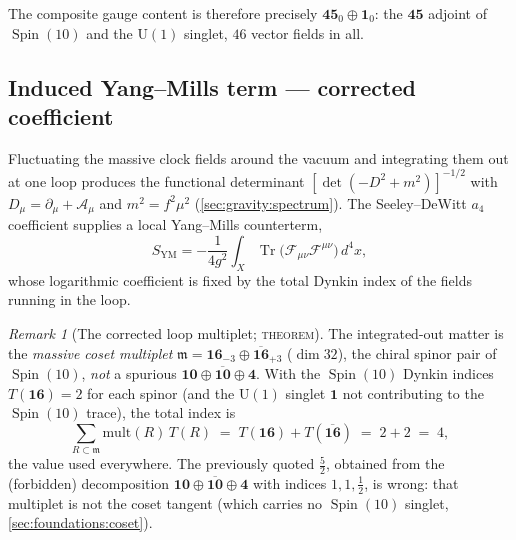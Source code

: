 \documentclass[11pt]{article}
\theoremstyle{plain}
\theoremstyle{definition}
\theoremstyle{remark}
\newtheorem{remark}[theorem]{Remark}
\newcommand{\U}[1]{\mathrm{U}(#1)}
\newcommand{\Spin}{\operatorname{Spin}}
\newcommand{\Tr}{\operatorname{Tr}}
\newcommand{\Uone}{\U{1}}
\begin{document}
The composite gauge content is therefore precisely $\mathbf{45}_{0}\oplus\mathbf 1_{0}$:
the $\mathbf{45}$ adjoint of $\Spin(10)$ and the $\Uone$ singlet,
$46$ vector fields in all.

\subsection{Induced Yang--Mills term --- corrected coefficient}
\label{sec:gauge:YM}

Fluctuating the massive clock fields around the vacuum and integrating
them out at one loop produces the functional determinant
$[\det(-D^{2}+m^{2})]^{-1/2}$ with $D_\mu=\partial_\mu+\mathcal A_\mu$ and
$m^{2}=f^{2}\mu^{2}$ (\autoref{sec:gravity:spectrum}). The Seeley--DeWitt
$a_4$ coefficient supplies a local Yang--Mills counterterm,
\begin{equation}\label{eq:gauge:YM}
  S_{\text{YM}}
  = -\frac{1}{4g^{2}}\int_{X}\Tr\!\bigl(\mathcal F_{\mu\nu}\mathcal F^{\mu\nu}\bigr)\,d^{4}x,
\end{equation}
whose logarithmic coefficient is fixed by the total Dynkin index of the
fields running in the loop.

\begin{remark}[The corrected loop multiplet; \textsc{theorem}]
\label{rem:gauge:correctedindex}
The integrated-out matter is the \emph{massive coset multiplet}
$\mathfrak m=\mathbf{16}_{-3}\oplus\overline{\mathbf{16}}_{+3}$
($\dim 32$), the chiral spinor pair of $\Spin(10)$, \emph{not} a
spurious $\mathbf{10}\oplus\overline{\mathbf{10}}\oplus\mathbf 4$.
With the $\Spin(10)$ Dynkin indices $T(\mathbf{16})=2$ for each spinor
(and the $\Uone$ singlet $\mathbf 1$ not contributing to the
$\Spin(10)$ trace), the total index is
\begin{equation}\label{eq:gauge:totalindex}
  \sum_{R\subset\mathfrak m}\mathrm{mult}(R)\,T(R)
  \;=\; T(\mathbf{16})+T(\overline{\mathbf{16}})
  \;=\; 2+2 \;=\; 4,
\end{equation}
the value used everywhere. The previously quoted $\tfrac52$, obtained
from the (forbidden) decomposition $\mathbf{10}\oplus\overline{\mathbf{10}}\oplus\mathbf 4$
with indices $1,1,\tfrac12$, is wrong: that multiplet is not the coset
tangent (which carries no $\Spin(10)$ singlet, \autoref{sec:foundations:coset}).
\end{remark}
\end{document}
